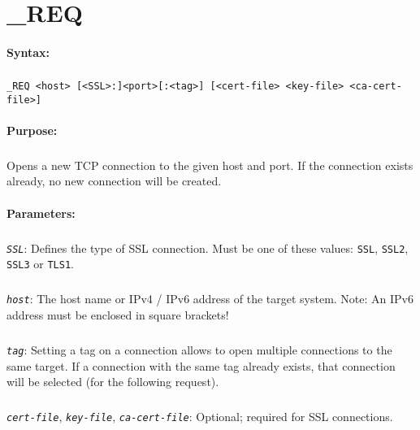 
\newpage
\section{\_REQ}
\label{cmd:_REQ}

\paragraph{Syntax:}
\subparagraph{}
\texttt{\_REQ <host> [<SSL>:]<port>[:<tag>] [<cert-file> <key-file> <ca-cert-file>]}

\paragraph{Purpose:}
\subparagraph{}
Opens a new TCP connection to the given host and port. If the connection exists already, 
no new connection will be created.

\paragraph{Parameters:}
\subparagraph{}
\textit{\texttt{SSL}}: Defines the type of SSL connection. Must be one of these values: 
\texttt{SSL}, \texttt{SSL2}, \texttt{SSL3} or \texttt{TLS1}.

\subparagraph{}
\textit{\texttt{host}}: The host name or IPv4 / IPv6 address of the target system. Note: An IPv6 address 
must be enclosed in square brackets!

\subparagraph{}
\textit{\texttt{tag}}: Setting a tag on a connection allows to open multiple connections to the same 
target. If a connection with the same tag already exists, that connection will be selected (for the 
following request).

\subparagraph{}
\textit{\texttt{cert-file}}, \textit{\texttt{key-file}}, \textit{\texttt{ca-cert-file}}: Optional; required 
for SSL connections. 


